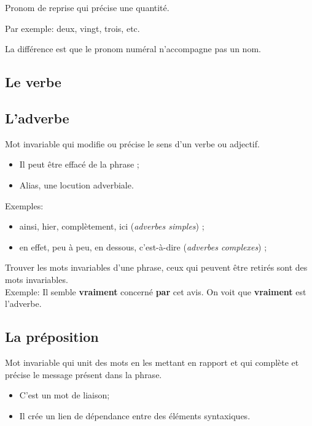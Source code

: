 \documentclass[10pt, french]{article}
\begin{document}
\begin{multicols*}{2}
\begin{definitionNOHFILLsub}
Pronom de reprise qui précise une quantité.

\tcbline

Par exemple: deux, vingt, trois, etc.
\end{definitionNOHFILLsub}

\begin{astuces}
La différence est que le pronom numéral n'accompagne pas un nom.
\end{astuces}


\columnbreak
\subsection{Le verbe}


\columnbreak
\subsection{L'adverbe}
\begin{definitionNOHFILLsub}[Adverbe]
Mot invariable qui modifie ou précise le sens d'un verbe ou adjectif.
\begin{itemize}
	\item	Il peut être effacé de la phrase ;
	\item	Alias, une locution adverbiale.
\end{itemize}

\tcbline

Exemples:
\begin{itemize}
	\item	ainsi, hier, complètement, ici (\textit{adverbes simples}) ;
	\item	en effet, peu à peu, en dessous, c'est-à-dire (\textit{adverbes complexes}) ;
\end{itemize}
\begin{astuces}
Trouver les mots invariables d'une phrase, ceux qui peuvent être retirés sont des mots invariables.\\
Exemple:	Il semble \textbf{\color{teal}vraiment} concerné \textbf{par} cet avis. On voit que \textbf{\color{teal}vraiment} est l'adverbe.
\end{astuces}
\end{definitionNOHFILLsub}


\subsection{La préposition}
\begin{definitionNOHFILL}[La préposition]
Mot invariable qui unit des mots en les mettant en rapport et qui complète et précise le message présent dans la phrase.
\begin{itemize}
	\item	C'est un mot de liaison;
	\item	Il crée un lien de dépendance entre des éléments syntaxiques.
\end{itemize}


\end{definitionNOHFILL}
\end{multicols*}
\end{document}
